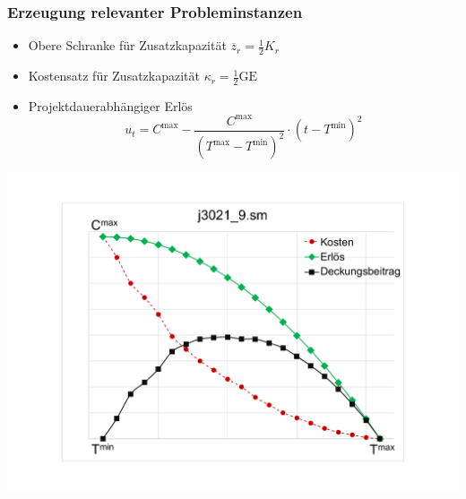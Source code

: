
\begin{frame}[noframenumbering]
	\frametitle{Erzeugung relevanter Probleminstanzen}
	\begin{itemize}
		\item Obere Schranke für Zusatzkapazität $\overline{z}_r=\frac{1}{2}K_r$
		\item Kostensatz für Zusatzkapazität $\kappa_r=\frac{1}{2}\mbox{GE}$
		\item Projektdauerabhängiger Erlös \[u_{t}=C^{\mbox{max}} - \frac{C^{\mbox{max}}}{(T^{\mbox{max}}-T^{\mbox{min}})^2} \cdot (t-T^{\mbox{min}})^2\]
	\end{itemize}
	\begin{center}
		\includegraphics[scale=0.26]{images/DeadlineCosts.pdf}
	\end{center}
\end{frame}


